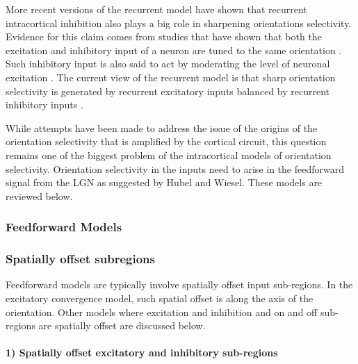 More recent versions of the recurrent model have shown that recurrent intracortical inhibition also plays a big role in sharpening orientations selectivity. Evidence for this claim comes from studies that have shown that both the excitation and inhibitory input of a neuron are tuned to the same orientation \cite{Anderson2000, Monier2003, Tan2011a}. Such inhibitory input is also said to act by moderating the level of neuronal excitation \cite{Nelson1998, Sato2016}. The current view of the recurrent model is that sharp orientation selectivity is generated by recurrent excitatory inputs balanced by recurrent inhibitory inputs \cite{Nelson1998, Shu2003}.


While attempts have been made to address the issue of the origins of the orientation selectivity that is amplified by the cortical circuit, this question remains one of the biggest problem of the intracortical models of orientation selectivity. Orientation selectivity in the inputs need to arise in the feedforward signal from the LGN as suggested by Hubel and Wiesel. These models are reviewed below. 



\subsubsection{Feedforward Models}

\subsubsection{Spatially offset subregions}

Feedforward models are typically involve spatially offset input sub-regions. In the excitatory convergence model, such spatial offset is along the axis of the orientation. Other models where excitation and inhibition and on and off sub-regions are spatially offset are discussed below.

\paragraph{1) Spatially offset excitatory and inhibitory sub-regions}

